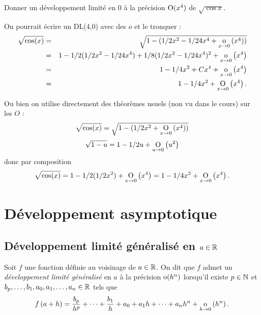 \documentclass{magnoliaold}
\begin{document}
        \begin{exoUnique}
        \exo Donner un développement limité en 0 à la précision ${\rm O}(x^4)$ de $\sqrt{\cos x}$.
        \end{exoUnique}
        
        \begin{sol}
        On pourrait écrire un DL(4,0) avec des $o$ et le tronquer :
        \begin{eqnarray*}
        \sqrt{\cos(x)}&=&\sqrt{1-(1/2x^2-1/24x^4+\underset{x \rightarrow 0}{\text{o}}\left(x^4\right))}\\
        &=&1-1/2(1/2x^2-1/24x^4)+1/8(1/2x^2-1/24x^4)^2+\underset{x \rightarrow 0}{\text{o}}\left(x^4\right)\\
        &=&1-1/4x^2+Cx^4+\underset{x \rightarrow 0}{\text{o}}\left(x^4\right)\\
        &=&1-1/4x^2+\underset{x \rightarrow 0}{\text{O}}\left(x^4\right).
        \end{eqnarray*}
        
        Ou bien on utilise directement des théorèmes usuels (non vu dans le cours) sur les $O$ :
        $$\sqrt{\cos(x)}=\sqrt{1-(1/2x^2+\underset{x \rightarrow 0}{\text{O}}\left(x^4\right))}$$
        $$\sqrt{1-u}=1-1/2u+\underset{u \rightarrow 0}{\text{O}}\left(u^2\right)$$ donc par composition
        $$\sqrt{\cos(x)}=1-1/2(1/2x^2)+\underset{x \rightarrow 0}{\text{O}}\left(x^4\right)=1-1/4x^2+\underset{x \rightarrow 0}{\text{O}}\left(x^4\right).$$
        \end{sol}

\section{Développement asymptotique}

\subsection{Développement limité généralisé en $a\in\mathbb{R}$}

\begin{definition}[utile=-3]
Soit $f$ une fonction définie au voisinage de $a\in\mathbb{R}$. On dit que $f$ admet
un \emph{développement limité généralisé} en $a$ à la précision ${\rm o}(h^n)$
lorsqu'il existe $p\in\mathbb{N}$ et $b_p,\ldots,b_1,a_0,a_1,\ldots,a_n\in\mathbb{R}$ tels
que
\[f\left(a+h\right)=\frac{b_p}{h^p}+\cdots+\frac{b_1}{h}+a_0+a_1h+\cdots+a_nh^n
  +\underset{h \rightarrow 0}{\text{o}}\left(h^n\right).\]
\end{definition}
\end{document}

